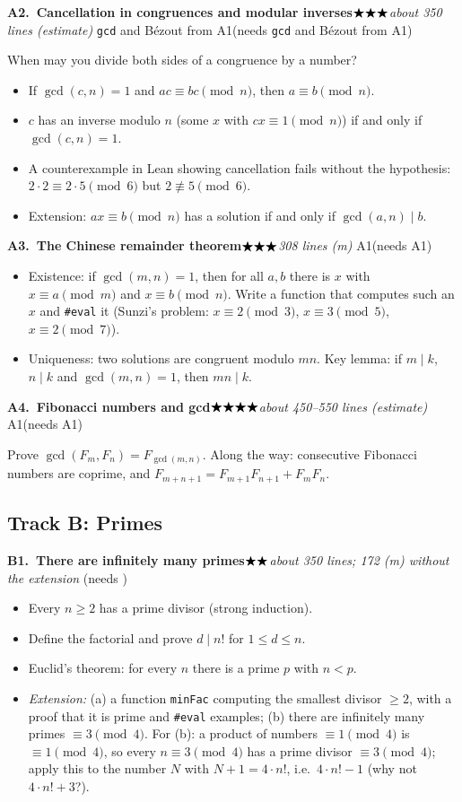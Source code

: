 \documentclass[11pt]{article}
\newcommand{\lean}[1]{\texttt{#1}}
\newcommand{\dvd}{\ensuremath{\mid}}
\newcommand{\stars}[1]{\ensuremath{%
  \ifcase#1\or\bigstar\or\bigstar\bigstar\or\bigstar\bigstar\bigstar\or
  \bigstar\bigstar\bigstar\bigstar\or\bigstar\bigstar\bigstar\bigstar\bigstar\fi}}
\newcommand{\topic}[5]{%
  \par\medskip\noindent\textbf{#1.\ #2}\hfill\quad\stars{#3}\enspace\textit{#4}%
  \ifx\relax#5\relax\else\enspace(needs #5)\fi\par\nopagebreak}
\begin{document}
\topic{A2}{Cancellation in congruences and modular inverses}{3}{about 350 lines (estimate)}{%
\lean{gcd} and B\'ezout from A1}
When may you divide both sides of a congruence by a number?
\begin{itemize}
\item If $\gcd(c, n) = 1$ and $ac \equiv bc \pmod n$, then $a \equiv b \pmod n$.
\item $c$ has an inverse modulo $n$ (some $x$ with $cx \equiv 1 \pmod n$) if and only if
  $\gcd(c, n) = 1$.
\item A counterexample in Lean showing cancellation fails without the hypothesis:
  $2 \cdot 2 \equiv 2 \cdot 5 \pmod 6$ but $2 \not\equiv 5 \pmod 6$.
\item Extension: $ax \equiv b \pmod n$ has a solution if and only if $\gcd(a, n) \dvd b$.
\end{itemize}

\topic{A3}{The Chinese remainder theorem}{3}{308 lines (m)}{A1}
\begin{itemize}
\item Existence: if $\gcd(m, n) = 1$, then for all $a, b$ there is $x$ with
  $x \equiv a \pmod m$ and $x \equiv b \pmod n$. Write a function that computes such an $x$ and
  \lean{\#eval} it (Sunzi's problem: $x \equiv 2 \pmod 3$, $x \equiv 3 \pmod 5$,
  $x \equiv 2 \pmod 7$).
\item Uniqueness: two solutions are congruent modulo $mn$. Key lemma: if $m \dvd k$,
  $n \dvd k$ and $\gcd(m, n) = 1$, then $mn \dvd k$.
\end{itemize}

\topic{A4}{Fibonacci numbers and gcd}{4}{about 450--550 lines (estimate)}{A1}
Prove $\gcd(F_m, F_n) = F_{\gcd(m, n)}$. Along the way: consecutive Fibonacci numbers are
coprime, and $F_{m+n+1} = F_{m+1}F_{n+1} + F_m F_n$.

\subsection*{Track B: Primes}

\topic{B1}{There are infinitely many primes}{2}{about 350 lines; 172 (m) without the
extension}{}
\begin{itemize}
\item Every $n \ge 2$ has a prime divisor (strong induction).
\item Define the factorial and prove $d \dvd n!$ for $1 \le d \le n$.
\item Euclid's theorem: for every $n$ there is a prime $p$ with $n < p$.
\item \emph{Extension:} (a) a function \lean{minFac} computing the smallest divisor $\ge 2$, with
  a proof that it is prime and \lean{\#eval} examples; (b) there are infinitely many primes
  $\equiv 3 \pmod 4$. For (b): a product of numbers $\equiv 1 \pmod 4$ is $\equiv 1 \pmod 4$, so
  every $n \equiv 3 \pmod 4$ has a prime divisor $\equiv 3 \pmod 4$; apply this to the number $N$
  with $N + 1 = 4 \cdot n!$, i.e.\ $4 \cdot n! - 1$ (why not $4 \cdot n! + 3$?).
\end{itemize}
\end{document}
